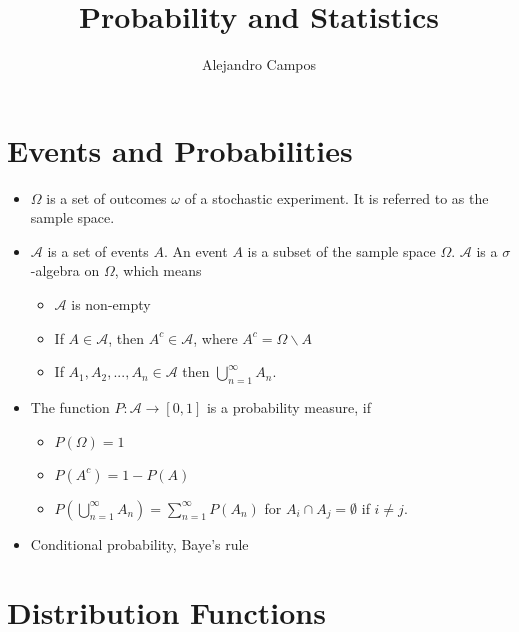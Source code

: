 \documentclass[11pt]{article}
\title{Probability and Statistics}
\author{Alejandro Campos}
\begin{document}
\maketitle
\tableofcontents

\section{Events and Probabilities}
\begin{itemize}
\item $\Omega$ is a set of outcomes $\omega$ of a stochastic experiment. It is referred to as the sample space.
\item $\mathcal{A}$ is a set of events $A$. An event $A$ is a subset of the sample space $\Omega$. $\mathcal{A}$ is a $\sigma$-algebra on $\Omega$, which means
\begin{itemize}
\item $\mathcal{A}$ is non-empty
\item If $A \in \mathcal{A}$, then $A^c \in \mathcal{A}$, where $A^c = \Omega \backslash A$
\item If $A_1, A_2, ..., A_n \in \mathcal{A}$ then $\bigcup_{n=1}^{\infty}A_n$.
\end{itemize}  
\item The function $P: \mathcal{A} \to [0,1]$ is a probability measure, if
\begin{itemize}
\item $P(\Omega) = 1$
\item $P(A^c) = 1 - P(A)$
\item $P \left ( \bigcup_{n=1}^\infty A_n \right ) = \sum_{n=1}^\infty P(A_n)$ for $A_i \cap A_j = \emptyset$ if $i \ne j$.
\end{itemize}
\item Conditional probability, Baye's rule
\end{itemize}
\section{Distribution Functions}
\end{document}

